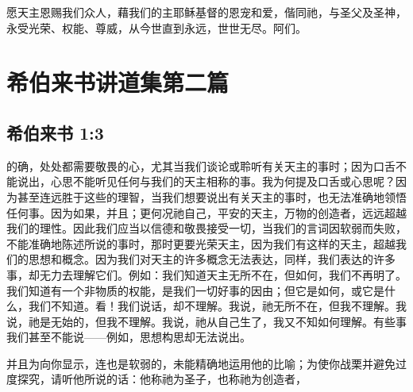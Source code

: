 愿天主恩赐我们众人，藉我们的主耶稣基督的恩宠和爱，偕同祂，与圣父及圣神，永受光荣、权能、尊威，从今世直到永远，世世无尽。阿们。\par



\section{希伯来书讲道集第二篇}


\subsection{希伯来书 1:3}

\par

的确，处处都需要敬畏的心，尤其当我们谈论或聆听有关天主的事时；因为口舌不能说出，心思不能听见任何与我们的天主相称的事。我为何提及口舌或心思呢？因为甚至连远胜于这些的理智，当我们想要说出有关天主的事时，也无法准确地领悟任何事。因为如果，并且；更何况祂自己，平安的天主，万物的创造者，远远超越我们的理性。因此我们应当以信德和敬畏接受一切，当我们的言词因软弱而失败，不能准确地陈述所说的事时，那时更要光荣天主，因为我们有这样的天主，超越我们的思想和概念。因为我们对天主的许多概念无法表达，同样，我们表达的许多事，却无力去理解它们。例如：我们知道天主无所不在，但如何，我们不再明了。我们知道有一个非物质的权能，是我们一切好事的因由；但它是如何，或它是什么，我们不知道。看！我们说话，却不理解。我说，祂无所不在，但我不理解。我说，祂是无始的，但我不理解。我说，祂从自己生了，我又不知如何理解。有些事我们甚至不能说——例如，思想构思却无法说出。\par

并且为向你显示，连也是软弱的，未能精确地运用他的比喻；为使你战栗并避免过度探究，请听他所说的话：他称祂为圣子，也称祂为创造者，\par

